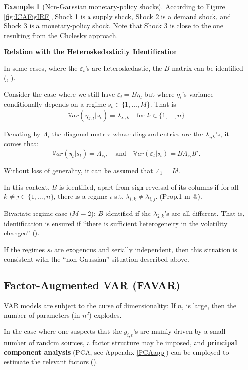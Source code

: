 \documentclass[
  12pt,
]{book}
\theoremstyle{definition}
\theoremstyle{definition}
\newtheorem{example}{Example}[chapter]
\theoremstyle{definition}
\theoremstyle{definition}
\theoremstyle{remark}
\begin{document}
\begin{example}[Non-Gaussian monetary-policy shocks]
According to Figure \ref{fig:ICAFigIRF}, Shock 1 is a supply shock, Shock 2 is a demand shock, and Shock 3 is a monetary-policy shock. Note that Shock 3 is close to the one resulting from the Cholesky approach.
\end{example}

\textbf{Relation with the Heteroskedasticity Identification}

In some cases, where the \(\varepsilon_t\)'s are heteroskedastic, the \(B\) matrix can be identified (\citet{Rigobon_2003}, \citet{LANNE2010121}).

Consider the case where we still have \(\varepsilon_t = B \eta_t\) but where \(\eta_t\)'s variance conditionally depends on a regime \(s_t \in \{1,\dots,M\}\). That is:
\[
\mathbb{V}ar(\eta_{k,t}|s_t) = \lambda_{s_t,k} \quad \mbox{for } k \in \{1,\dots,n\}
\]

Denoting by \(\Lambda_i\) the diagonal matrix whose diagonal entries are the \(\lambda_{i,k}\)'s, it comes that:
\[
\mathbb{V}ar(\eta_{t}|s_t) = \Lambda_{s_t},\quad \mbox{and}\quad \mathbb{V}ar(\varepsilon_{t}|s_t) = B\Lambda_{s_t}B'.
\]

Without loss of generality, it can be assumed that \(\Lambda_1=Id\).

In this context, \(B\) is identified, apart from sign reversal of its columns if for all \(k \ne j \in \{1,\dots,n\}\), there is a regime \(i\) s.t. \(\lambda_{i,k} \ne \lambda_{i,j}\). (Prop.1 in @\citet{LANNE2010121}).

Bivariate regime case (\(M=2\)): \(B\) identified if the \(\lambda_{2,k}\)'s are all different. That is, identification is ensured if ``there is sufficient heterogeneity in the volatility changes'' (\citet{LUTKEPOHL20172}).

If the regimes \(s_t\) are exogenous and serially independent, then this situation is consistent with the ``non-Gaussian'' situation described above.

\hypertarget{factor-augmented-var-favar}{%
\subsection{Factor-Augmented VAR (FAVAR)}\label{factor-augmented-var-favar}}

VAR models are subject to the curse of dimensionality: If \(n\), is large, then the number of parameters (in \(n^2\)) explodes.

In the case where one suspects that the \(y_{i,t}\)'s are mainly driven by a small number of random sources, a factor structure may be imposed, and \textbf{principal component analysis} (PCA, see Appendix \ref{PCAapp}) can be employed to estimate the relevant factors (\citet{Bernanke_Boivin_Eliasz_2005}).
\end{document}
